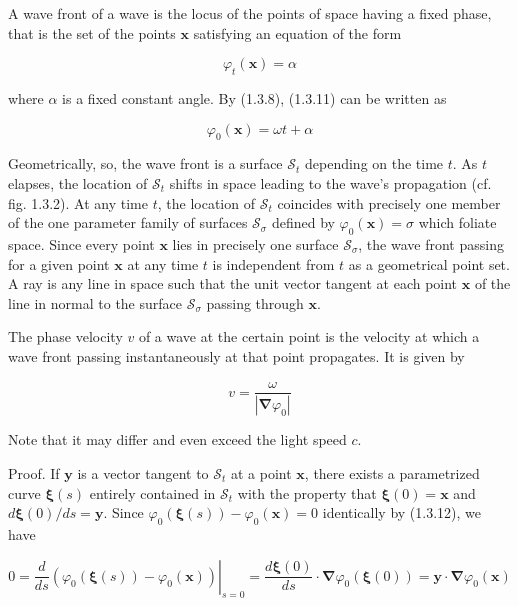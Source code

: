 \documentclass{article}
\begin{document}
A wave front of a wave is the locus of the points of space having a fixed phase, that is the set of the points $\boldsymbol{x}$ satisfying an equation of the form
 
\begin{equation*}
\varphi_{t}(\boldsymbol{x})=\alpha \tag{1.3.11}
\end{equation*}
 
where $\alpha$ is a fixed constant angle. By (1.3.8), (1.3.11) can be written as
 
\begin{equation*}
\varphi_{0}(\boldsymbol{x})=\omega t+\alpha \tag{1.3.12}
\end{equation*}
 

Geometrically, so, the wave front is a surface $\mathcal{S}_{t}$ depending on the time $t$. As $t$ elapses, the location of $\mathcal{S}_{t}$ shifts in space leading to the wave's propagation (cf. fig. 1.3.2). At any time $t$, the location of $\mathcal{S}_{t}$ coincides with precisely one member of the one parameter family of surfaces $\mathcal{S}_{\sigma}$ defined by $\varphi_{0}(\boldsymbol{x})=\sigma$ which foliate space. Since every point $\boldsymbol{x}$ lies in precisely one surface $\mathcal{S}_{\sigma}$, the wave front passing for a given point $\boldsymbol{x}$ at any time $t$ is independent from $t$ as a geometrical point set. A ray is any line in space such that the unit vector tangent at each point $\boldsymbol{x}$ of the line in normal to the surface $\mathcal{S}_{\sigma}$ passing through $\boldsymbol{x}$.

The phase velocity $v$ of a wave at the certain point is the velocity at which a wave front passing instantaneously at that point propagates. It is given by
 
\begin{equation*}
v=\frac{\omega}{\left|\boldsymbol{\nabla} \varphi_{0}\right|} \tag{1.3.13}
\end{equation*}
 

Note that it may differ and even exceed the light speed $c$.

Proof. If $\boldsymbol{y}$ is a vector tangent to $\mathcal{S}_{t}$ at a point $\boldsymbol{x}$, there exists a parametrized curve $\boldsymbol{\xi}(s)$ entirely contained in $\mathcal{S}_{t}$ with the property that $\boldsymbol{\xi}(0)=\boldsymbol{x}$ and $d \boldsymbol{\xi}(0) / d s=\boldsymbol{y}$. Since
$\varphi_{0}(\boldsymbol{\xi}(s))-\varphi_{0}(\boldsymbol{x})=0$ identically by (1.3.12), we have
 
\begin{equation*}
0=\left.\frac{d}{d s}\left(\varphi_{0}(\boldsymbol{\xi}(s))-\varphi_{0}(\boldsymbol{x})\right)\right|_{s=0}=\frac{d \boldsymbol{\xi}(0)}{d s} \cdot \boldsymbol{\nabla} \varphi_{0}(\boldsymbol{\xi}(0))=\boldsymbol{y} \cdot \boldsymbol{\nabla} \varphi_{0}(\boldsymbol{x}) \tag{1.3.14}
\end{equation*}
 
\end{document}
